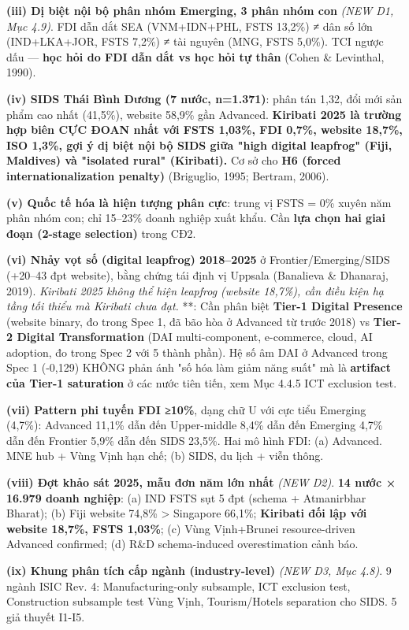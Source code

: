\documentclass[12pt,a4paper]{article}
\begin{document}
\textbf{(iii) Dị biệt nội bộ phân nhóm Emerging, 3 phân nhóm con}
\emph{(NEW D1, Mục 4.9)}. FDI dẫn dắt SEA (VNM+IDN+PHL, FSTS 13,2\%) ≠
dân số lớn (IND+LKA+JOR, FSTS 7,2\%) ≠ tài nguyên (MNG, FSTS 5,0\%). TCI
ngược dấu --- \textbf{học hỏi do FDI dẫn dắt vs học hỏi tự thân} (Cohen
\& Levinthal, 1990).

\textbf{(iv) SIDS Thái Bình Dương (7 nước, n=1.371)}: phân tán 1,32, đổi
mới sản phẩm cao nhất (41,5\%), website 58,9\% gần Advanced.
\textbf{Kiribati 2025 là trường hợp biên CỰC ĐOAN nhất với FSTS 1,03\%,
FDI 0,7\%, website 18,7\%, ISO 1,3\%, gợi ý dị biệt nội bộ SIDS giữa
"high digital leapfrog" (Fiji, Maldives) và "isolated rural"
(Kiribati).} Cơ sở cho \textbf{H6 (forced internationalization penalty)}
(Briguglio, 1995; Bertram, 2006).

\textbf{(v) Quốc tế hóa là hiện tượng phân cực}: trung vị FSTS = 0\%
xuyên năm phân nhóm con; chỉ 15--23\% doanh nghiệp xuất khẩu. Cần
\textbf{lựa chọn hai giai đoạn (2-stage selection)} trong CĐ2.

\textbf{(vi) Nhảy vọt số (digital leapfrog) 2018--2025} ở
Frontier/Emerging/SIDS (+20--43 đpt website), bằng chứng tái định vị
Uppsala (Banalieva \& Dhanaraj, 2019). \emph{Kiribati 2025 không thể
hiện leapfrog (website 18,7\%), cần điều kiện hạ tầng tối thiểu mà
Kiribati chưa đạt.} **: Cần phân biệt \textbf{Tier-1 Digital Presence}
(website binary, đo trong Spec 1, đã bão hòa ở Advanced từ trước 2018)
vs \textbf{Tier-2 Digital Transformation} (DAI multi-component,
e-commerce, cloud, AI adoption, đo trong Spec 2 với 5 thành phần). Hệ số
âm DAI ở Advanced trong Spec 1 (-0,129) KHÔNG phản ánh "số hóa làm giảm
năng suất" mà là \textbf{artifact của Tier-1 saturation} ở các nước tiên
tiến, xem Mục 4.4.5 ICT exclusion test.

\textbf{(vii) Pattern phi tuyến FDI ≥10\%}, dạng chữ U với cực tiểu
Emerging (4,7\%): Advanced 11,1\% dẫn đến Upper-middle 8,4\% dẫn đến
Emerging 4,7\% dẫn đến Frontier 5,9\% dẫn đến SIDS 23,5\%. Hai mô hình
FDI: (a) Advanced. MNE hub + Vùng Vịnh hạn chế; (b) SIDS, du lịch + viễn
thông.

\textbf{(viii) Đợt khảo sát 2025, mẫu đơn năm lớn nhất} \emph{(NEW D2)}.
\textbf{14 nước × 16.979 doanh nghiệp}: (a) IND FSTS sụt 5 đpt (schema +
Atmanirbhar Bharat); (b) Fiji website 74,8\% \textgreater{} Singapore
66,1\%; \textbf{Kiribati đối lập với website 18,7\%, FSTS 1,03\%}; (c)
Vùng Vịnh+Brunei resource-driven Advanced confirmed; (d) R\&D
schema-induced overestimation cảnh báo.

\textbf{(ix) Khung phân tích cấp ngành (industry-level)} \emph{(NEW D3,
Mục 4.8)}. 9 ngành ISIC Rev. 4: Manufacturing-only subsample, ICT
exclusion test, Construction subsample test Vùng Vịnh, Tourism/Hotels
separation cho SIDS. 5 giả thuyết I1-I5.
\end{document}
